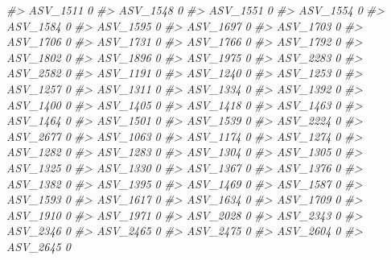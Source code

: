 \documentclass[
]{article}
\newenvironment{Shaded}{\begin{snugshade}}{\end{snugshade}}
\newcommand{\CommentTok}[1]{\textcolor[rgb]{0.56,0.35,0.01}{\textit{#1}}}
\begin{document}
\begin{Shaded}
\begin{Highlighting}[]
\CommentTok{\#\textgreater{} ASV\_1511  0}
\CommentTok{\#\textgreater{} ASV\_1548  0}
\CommentTok{\#\textgreater{} ASV\_1551  0}
\CommentTok{\#\textgreater{} ASV\_1554  0}
\CommentTok{\#\textgreater{} ASV\_1584  0}
\CommentTok{\#\textgreater{} ASV\_1595  0}
\CommentTok{\#\textgreater{} ASV\_1697  0}
\CommentTok{\#\textgreater{} ASV\_1703  0}
\CommentTok{\#\textgreater{} ASV\_1706  0}
\CommentTok{\#\textgreater{} ASV\_1731  0}
\CommentTok{\#\textgreater{} ASV\_1766  0}
\CommentTok{\#\textgreater{} ASV\_1792  0}
\CommentTok{\#\textgreater{} ASV\_1802  0}
\CommentTok{\#\textgreater{} ASV\_1896  0}
\CommentTok{\#\textgreater{} ASV\_1975  0}
\CommentTok{\#\textgreater{} ASV\_2283  0}
\CommentTok{\#\textgreater{} ASV\_2582  0}
\CommentTok{\#\textgreater{} ASV\_1191  0}
\CommentTok{\#\textgreater{} ASV\_1240  0}
\CommentTok{\#\textgreater{} ASV\_1253  0}
\CommentTok{\#\textgreater{} ASV\_1257  0}
\CommentTok{\#\textgreater{} ASV\_1311  0}
\CommentTok{\#\textgreater{} ASV\_1334  0}
\CommentTok{\#\textgreater{} ASV\_1392  0}
\CommentTok{\#\textgreater{} ASV\_1400  0}
\CommentTok{\#\textgreater{} ASV\_1405  0}
\CommentTok{\#\textgreater{} ASV\_1418  0}
\CommentTok{\#\textgreater{} ASV\_1463  0}
\CommentTok{\#\textgreater{} ASV\_1464  0}
\CommentTok{\#\textgreater{} ASV\_1501  0}
\CommentTok{\#\textgreater{} ASV\_1539  0}
\CommentTok{\#\textgreater{} ASV\_2224  0}
\CommentTok{\#\textgreater{} ASV\_2677  0}
\CommentTok{\#\textgreater{} ASV\_1063  0}
\CommentTok{\#\textgreater{} ASV\_1174  0}
\CommentTok{\#\textgreater{} ASV\_1274  0}
\CommentTok{\#\textgreater{} ASV\_1282  0}
\CommentTok{\#\textgreater{} ASV\_1283  0}
\CommentTok{\#\textgreater{} ASV\_1304  0}
\CommentTok{\#\textgreater{} ASV\_1305  0}
\CommentTok{\#\textgreater{} ASV\_1325  0}
\CommentTok{\#\textgreater{} ASV\_1330  0}
\CommentTok{\#\textgreater{} ASV\_1367  0}
\CommentTok{\#\textgreater{} ASV\_1376  0}
\CommentTok{\#\textgreater{} ASV\_1382  0}
\CommentTok{\#\textgreater{} ASV\_1395  0}
\CommentTok{\#\textgreater{} ASV\_1469  0}
\CommentTok{\#\textgreater{} ASV\_1587  0}
\CommentTok{\#\textgreater{} ASV\_1593  0}
\CommentTok{\#\textgreater{} ASV\_1617  0}
\CommentTok{\#\textgreater{} ASV\_1634  0}
\CommentTok{\#\textgreater{} ASV\_1709  0}
\CommentTok{\#\textgreater{} ASV\_1910  0}
\CommentTok{\#\textgreater{} ASV\_1971  0}
\CommentTok{\#\textgreater{} ASV\_2028  0}
\CommentTok{\#\textgreater{} ASV\_2343  0}
\CommentTok{\#\textgreater{} ASV\_2346  0}
\CommentTok{\#\textgreater{} ASV\_2465  0}
\CommentTok{\#\textgreater{} ASV\_2475  0}
\CommentTok{\#\textgreater{} ASV\_2604  0}
\CommentTok{\#\textgreater{} ASV\_2645  0}

\end{Highlighting}
\end{Shaded}
\end{document}
